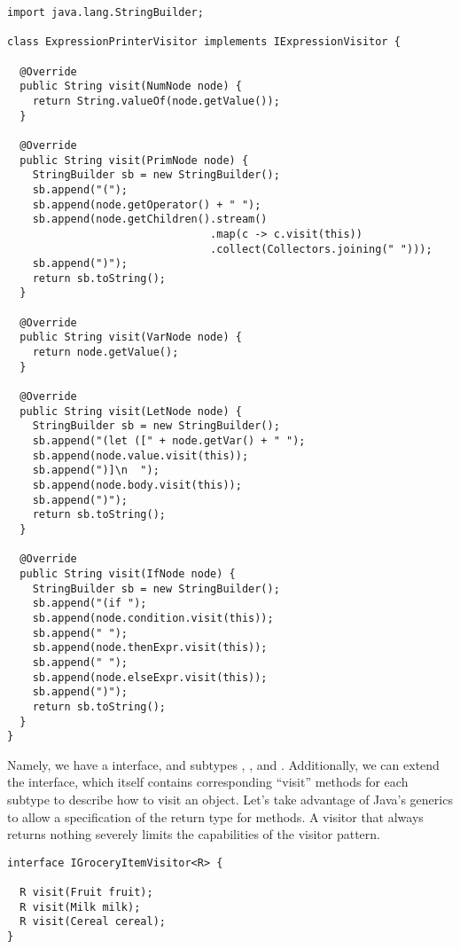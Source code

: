 \enlargethispage{-3\baselineskip}
\begin{lstlisting}[language=MyJava]
import java.lang.StringBuilder; 

class ExpressionPrinterVisitor implements IExpressionVisitor {

  @Override
  public String visit(NumNode node) {
    return String.valueOf(node.getValue());
  }
  
  @Override
  public String visit(PrimNode node) {
    StringBuilder sb = new StringBuilder();
    sb.append("(");
    sb.append(node.getOperator() + " ");
    sb.append(node.getChildren().stream()
                                .map(c -> c.visit(this))
                                .collect(Collectors.joining(" ")));
    sb.append(")");
    return sb.toString();
  }
  
  @Override
  public String visit(VarNode node) {
    return node.getValue();
  }
  
  @Override
  public String visit(LetNode node) {
    StringBuilder sb = new StringBuilder();
    sb.append("(let ([" + node.getVar() + " ");
    sb.append(node.value.visit(this));
    sb.append(")]\n  ");
    sb.append(node.body.visit(this));
    sb.append(")");
    return sb.toString();
  }
  
  @Override
  public String visit(IfNode node) {
    StringBuilder sb = new StringBuilder();
    sb.append("(if ");
    sb.append(node.condition.visit(this));
    sb.append(" ");
    sb.append(node.thenExpr.visit(this));
    sb.append(" ");
    sb.append(node.elseExpr.visit(this));
    sb.append(")");
    return sb.toString();
  }
}
\end{lstlisting}

Namely, we have a  interface, and subtypes , , and . 
Additionally, we can extend the  interface, which itself contains corresponding ``visit'' methods for each subtype to describe how to visit an  object. 
Let's take advantage of Java's generics to allow a specification of the return type for  methods. 
A visitor that always returns nothing severely limits the capabilities of the visitor pattern.

\begin{lstlisting}[language=MyJava]
interface IGroceryItemVisitor<R> {

  R visit(Fruit fruit);
  R visit(Milk milk);
  R visit(Cereal cereal);
}
\end{lstlisting}

